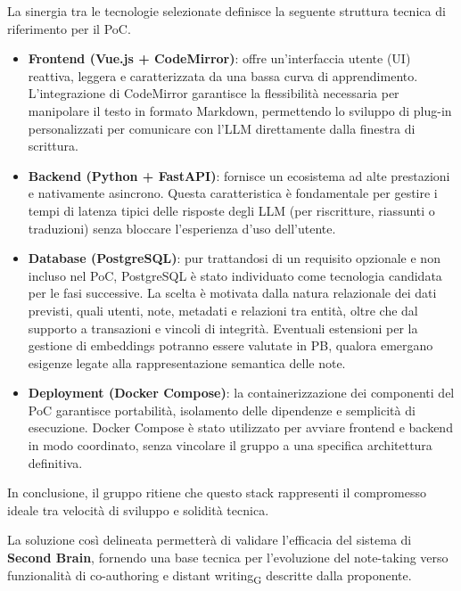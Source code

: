 La sinergia tra le tecnologie selezionate definisce la seguente struttura tecnica di riferimento per il PoC.
\begin{itemize}
    \item \textbf{Frontend (Vue.js + CodeMirror)}: offre un'interfaccia utente (UI) reattiva, leggera e caratterizzata da una bassa curva di apprendimento. L'integrazione di CodeMirror garantisce la flessibilità necessaria per manipolare il testo in formato Markdown, permettendo lo sviluppo di plug-in personalizzati per comunicare con l'LLM direttamente dalla finestra di scrittura.
    \item \textbf{Backend (Python + FastAPI)}: fornisce un ecosistema ad alte prestazioni e nativamente asincrono. Questa caratteristica è fondamentale per gestire i tempi di latenza tipici delle risposte degli LLM (per riscritture, riassunti o traduzioni) senza bloccare l'esperienza d'uso dell'utente.
    \item \textbf{Database (PostgreSQL)}: pur trattandosi di un requisito opzionale e non incluso
        nel PoC, PostgreSQL è stato individuato come tecnologia candidata per le fasi successive.
        La scelta è motivata dalla natura relazionale dei dati previsti, quali utenti, note, metadati
        e relazioni tra entità, oltre che dal supporto a transazioni e vincoli di integrità. Eventuali
        estensioni per la gestione di embeddings potranno essere valutate in PB, qualora emergano
        esigenze legate alla rappresentazione semantica delle note.
    \item \textbf{Deployment (Docker Compose)}: la containerizzazione dei componenti del PoC
        garantisce portabilità, isolamento delle dipendenze e semplicità di esecuzione. Docker Compose
        è stato utilizzato per avviare frontend e backend in modo coordinato, senza vincolare il gruppo
        a una specifica architettura definitiva.
\end{itemize}

In conclusione, il gruppo ritiene che questo stack rappresenti il compromesso ideale tra velocità di sviluppo e solidità tecnica.

La soluzione così delineata permetterà di validare l'efficacia del sistema di \textbf{Second Brain}, fornendo una base tecnica per l'evoluzione del note-taking verso funzionalità di co-authoring e distant writing\textsubscript{G} descritte dalla proponente.